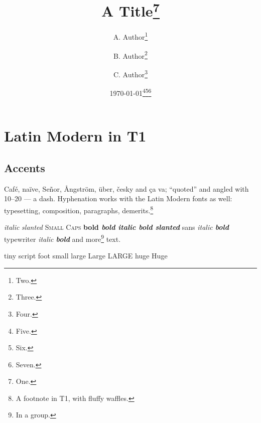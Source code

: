 \documentclass[11pt]{article}
\title{A Title\thanks{One.}}
\author{A. Author\thanks{Two.} \and B. Author\thanks{Three.} \and C. Author\thanks{Four.}}
\date{\today\thanks{Five.}\thanks{Six.}\thanks{Seven.}}
\begin{document}
\maketitle
\section{Latin Modern in T1}
\subsection{Accents}
Café, naïve, Señor, Ångström, \"{u}ber, \v{c}esky and \c{c}a va; ``quoted'' and \guillemotleft angled\guillemotright{} with 10--20 --- a dash. Hyphenation works with the Latin Modern fonts as well: typesetting, composition, paragraphs, demerits.\footnote{A footnote in T1, with fluffy waffles.}

{\itshape italic} {\slshape slanted} {\scshape Small Caps} {\bfseries bold \itshape bold italic \slshape bold slanted}
{\sffamily sans \itshape italic \bfseries bold} {\ttfamily typewriter \itshape italic \bfseries bold} and {\small more\footnote{In a group.}} text.

{\tiny tiny} {\scriptsize script} {\footnotesize foot} {\small small} {\large large} {\Large Large} {\LARGE LARGE} {\huge huge} {\Huge Huge}
\end{document}
